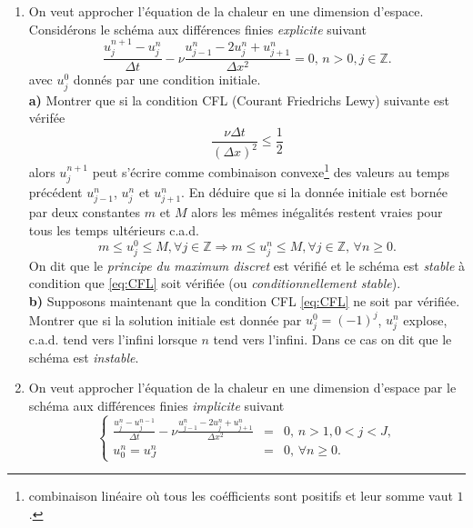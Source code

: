 \documentclass[12pt,a4paper]{article}
\begin{document}
\begin{enumerate}
\item On veut approcher l'\'equation de la chaleur en une dimension
  d'espace. Consid\'erons le sch\'ema aux diff\'erences finies {\it explicite}
  suivant
\begin{equation}
\frac{u_j^{n+1}-u_j^n}{\Delta
  t}-\nu\frac{u_{j-1}^n-2u_j^n+u_{j+1}^n}{\Delta x^2} = 0,\, n >0,
j\in \mathbb{Z}.
\end{equation}
avec $u_j^0$ donn\'es par une condition initiale.\\
{\bf a)} Montrer que si la condition CFL (Courant Friedrichs Lewy) suivante est
v\'erif\'ee
\begin{equation}\label{eq:CFL}
\frac{\nu\Delta t}{(\Delta x)^2}\le \frac{1}{2}
\end{equation}
alors $u_j^{n+1}$ peut s'\'ecrire comme combinaison
convexe\footnote{combinaison lin\'eaire o\`u tous les co\'efficients
  sont positifs et leur somme vaut $1$.} des
valeurs au temps pr\'ec\'edent $u_{j-1}^n$, $u_{j}^n$ et
$u_{j+1}^n$. En d\'eduire que si la donn\'ee initiale est born\'ee par
deux constantes $m$ et $M$ alors les m\^emes in\'egalit\'es restent
vraies pour tous les temps ult\'erieurs c.a.d.
\begin{equation}\label{eq:max}
m\le u_j^0\le M, \forall j\in\mathbb{Z} \Rightarrow m\le u_j^n\le M,
\forall j\in\mathbb{Z},\, \forall n\ge 0.
\end{equation}
On dit que le {\it principe du maximum discret} est v\'erifi\'e et le
sch\'ema est {\it stable} \`a condition que \eqref{eq:CFL} soit
v\'erifi\'ee (ou {\it conditionnellement stable}). \\
{\bf b)} Supposons maintenant que la condition CFL \eqref{eq:CFL} ne soit par
v\'erifi\'ee. Montrer que si la solution initiale est donn\'ee par
$u_j^0=(-1)^j$, $u_j^n$ explose, c.a.d. tend vers l'infini lorsque $n$
tend vers l'infini. Dans ce cas on dit que le sch\'ema est {\it instable}.
\item On veut approcher l'\'equation de la chaleur en une dimension
  d'espace par le sch\'ema aux diff\'erences finies {\it implicite}
  suivant 
\begin{equation}
\left\{\begin{array}{lcl}
\displaystyle\frac{u_j^{n}-u_j^{n-1}}{\Delta
  t}-\nu\frac{u_{j-1}^n-2u_j^n+u_{j+1}^n}{\Delta x^2} &=& 0,\, n >1,
0<j<J,\\[2ex]
u_0^n = u_J^n & = &0,\, \forall n\ge 0.
\end{array}\right.
\end{equation}

\end{enumerate}
\end{document}
